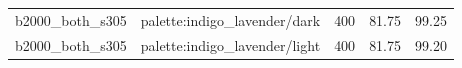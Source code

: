 \begin{longtable}{l>{\raggedright\arraybackslash}p{.42\linewidth}rrr}
b2000\_\allowbreak{}both\_\allowbreak{}s305 & %
palette:indigo\_\allowbreak{}lavender/dark & %
400 & %
81.75 & %
99.25 \\ %

b2000\_\allowbreak{}both\_\allowbreak{}s305 & %
palette:indigo\_\allowbreak{}lavender/light & %
400 & %
81.75 & %
99.20 \\ %


\end{longtable}
